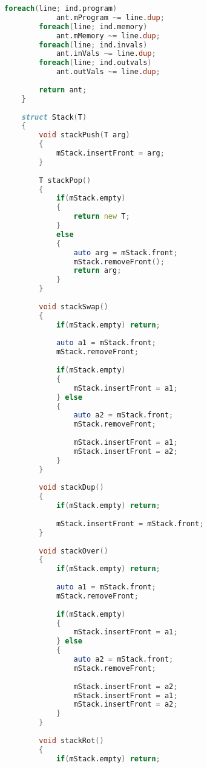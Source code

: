\documentclass[russian,utf8,emptystyle]{eskdtext}
\begin{document}
\begin{lstlisting}[language=D]
        foreach(line; ind.program)
            ant.mProgram ~= line.dup;
        foreach(line; ind.memory)
            ant.mMemory ~= line.dup;    
        foreach(line; ind.invals)
            ant.inVals ~= line.dup;     
        foreach(line; ind.outvals)
            ant.outVals ~= line.dup;    
        
        return ant;
    } 
    
    struct Stack(T)
    {
        void stackPush(T arg)
        {
            mStack.insertFront = arg;
        }
        
        T stackPop()
        {
            if(mStack.empty)
            {
                return new T;
            } 
            else
            {
                auto arg = mStack.front;
                mStack.removeFront();
                return arg;
            }
        }
        
        void stackSwap()
        {
            if(mStack.empty) return;
            
            auto a1 = mStack.front;
            mStack.removeFront;
            
            if(mStack.empty)
            {
                mStack.insertFront = a1;
            } else
            {
                auto a2 = mStack.front;
                mStack.removeFront;
                
                mStack.insertFront = a1;
                mStack.insertFront = a2;
            }
        }
        
        void stackDup()
        {
            if(mStack.empty) return;
            
            mStack.insertFront = mStack.front;
        }
        
        void stackOver()
        {
            if(mStack.empty) return;
            
            auto a1 = mStack.front;
            mStack.removeFront;
            
            if(mStack.empty)
            {
                mStack.insertFront = a1;
            } else
            {
                auto a2 = mStack.front;
                mStack.removeFront;
                
                mStack.insertFront = a2;
                mStack.insertFront = a1;
                mStack.insertFront = a2;
            }
        }
        
        void stackRot()
        {
            if(mStack.empty) return;
            

\end{lstlisting}
\end{document}
